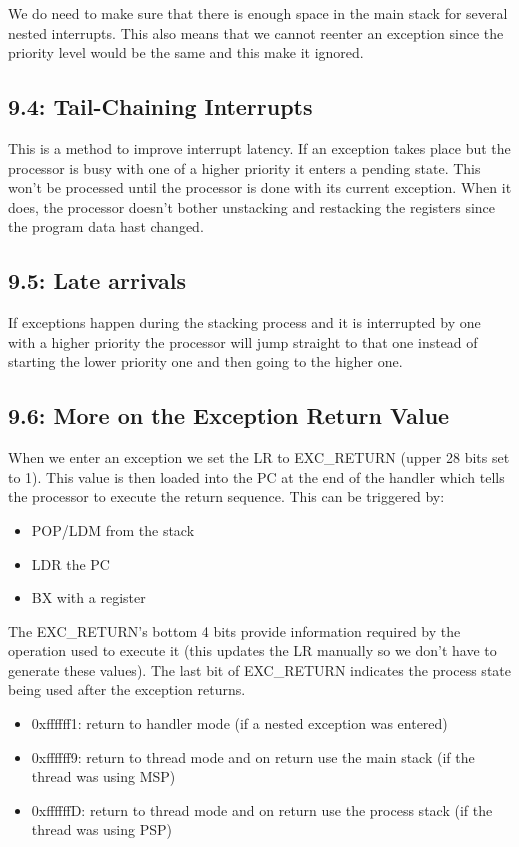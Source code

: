 \documentclass[12pt]{article}
\begin{document}
We do need to make sure that there is enough space in the main stack for several nested interrupts. This also means that we cannot reenter an exception since the priority level would be the same and this make it ignored.

\subsection*{9.4: Tail-Chaining Interrupts}
This is a method to improve interrupt latency. If an exception takes place but the processor is busy with one of a higher priority it enters a pending state. This won't be processed until the processor is done with its current exception. When it does, the processor doesn't bother unstacking and restacking the registers since the program data hast changed.

\subsection*{9.5: Late arrivals}
If exceptions happen during the stacking process and it is interrupted by one with a higher priority the processor will jump straight to that one instead of starting the lower priority one and then going to the higher one.

\subsection*{9.6: More on the Exception Return Value}
When we enter an exception we set the LR to EXC\_RETURN (upper 28 bits set to 1). This value is then loaded into the PC at the end of the handler which tells the processor to execute the return sequence. This can be triggered by:
\begin{itemize}
    \item POP/LDM from the stack
    \item LDR the PC
    \item BX with a register
\end{itemize}

The EXC\_RETURN's bottom 4 bits provide information required by the operation used to execute it (this updates the LR manually so we don't have to generate these values). The last bit of EXC\_RETURN indicates the process state being used after the exception returns.
\begin{itemize}
    \item 0xffffff1: return to handler mode (if a nested exception was entered)
    \item 0xffffff9: return to thread mode and on return use the main stack (if the thread was using MSP)
    \item 0xffffffD: return to thread mode and on return use the process stack (if the thread was using PSP)
\end{itemize}
\end{document}
